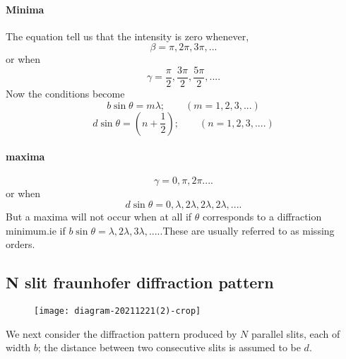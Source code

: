 \paragraph{Minima}
The equation tell us that the intensity is zero whenever,
$$\beta=\pi,2\pi,3\pi,...$$
or when $$\gamma=\frac{\pi}{2},\frac{3\pi}{2},\frac{5\pi}{2},....$$
Now the conditions become \\
$$b\sin \theta=m\lambda;\quad \quad (m=1,2,3,...)$$
$$d\sin \theta=\left( n+\frac{1}{2}\right) ; \quad \quad (n=1,2,3,....)$$
\paragraph{maxima}
$$\gamma=0,\pi,2\pi....$$
or when $$d\sin \theta=0,\lambda,2\lambda,2\lambda,2\lambda,....$$
But a maxima will not occur when at all if $\theta$ corresponds to a diffraction minimum.ie if $b\sin \theta=\lambda,2\lambda,3\lambda,....$.These are usually referred to as missing orders.
\subsection{N slit fraunhofer diffraction pattern}
\begin{figure}[H]
	\centering
	\texttt{[image: diagram-20211221(2)-crop]}
	\caption{}
	\label{}
\end{figure}
We next consider the diffraction pattern produced by $N$ parallel  slits, each of width $b$; the distance between two consecutive slits is assumed to be $d$.

